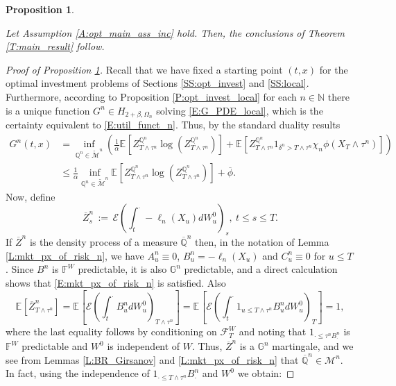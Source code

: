 \documentclass[11pt, letterpaper]{amsart}
\newtheorem{proposition}[theorem]{Proposition}
\theoremstyle{definition}
\theoremstyle{remark}
\numberwithin{equation}{section}
\newcommand{\nats}{\mathbb N}
\newcommand{\qprob}{\mathbb{Q}}
\newcommand{\esp}{\mathbb{E}}
\newcommand{\espalt}[2]{\esp^{#1}\bra{#2}}
\newcommand{\F}{\mathcal{F}}
\newcommand{\M}{\mathcal{M}}
\newcommand{\tM}{\widetilde{\mathcal{M}}}
\newcommand{\filt}{\mathbb{F}}
\newcommand{\filtg}{\mathbb{G}}
\newcommand{\EN}{\mathcal{E}}
\newcommand{\dfn}{\, := \,}
\newcommand{\bra}[1]{\left[#1\right]}
\newcommand{\ol}[1]{\overline{#1}}
\begin{document}
\begin{proposition}\label{P:unwind_prob_A}

Let Assumption \ref{A:opt_main_ass_inc} hold.  Then, the conclusions of Theorem \ref{T:main_result} follow.

\end{proposition}

\begin{proof}[Proof of Proposition \ref{P:unwind_prob_A}]

Recall that we have fixed a starting point $(t,x)$ for the optimal investment problems of Sections \ref{SS:opt_invest} and \ref{SS:local}. Furthermore, according to Proposition \ref{P:opt_invest_local} for each $n\in\nats$ there is a unique function $G^n\in H_{2+\beta,\Omega_n}$ solving \eqref{E:G_PDE_local}, which is the certainty equivalent to \eqref{E:util_funct_n}. Thus, by the standard duality results
\begin{equation}\label{E:standard_dual_local}
\begin{split}
G^n(t,x) &= \inf_{\qprob^n\in\tM^n}\left(\frac{1}{\alpha}\espalt{}{Z^{\qprob^n}_{T\wedge\tau^n}\log\left(Z^{\qprob^n}_{T\wedge\tau^n}\right)} + \espalt{}{Z^{\qprob^n}_{T\wedge\tau^n}1_{\delta^n>T\wedge\tau^n}\chi_n\phi(X_T\wedge\tau^n)}\right)\\
&\leq \frac{1}{\alpha} \inf_{\qprob^n\in\tM^n} \espalt{}{Z^{\qprob^n}_{T\wedge\tau^n}\log\left(Z^{\qprob^n}_{T\wedge\tau^n}\right)} + \ol{\phi}.
\end{split}
\end{equation}
Now, define
\begin{equation}\label{E:ol_Z_n_inc}
\ol{Z}^n_s \dfn \EN\left(\int_t^\cdot -\ell_n(X_u)dW^0_u\right)_s,\ t\leq s\leq T.
\end{equation}
If $\ol{Z}^n$ is the density process of a measure $\ol{\qprob}^n$ then, in the notation of Lemma \ref{L:mkt_px_of_risk_n}, we have $A^n_u \equiv 0$, $B^n_u = -\ell_n(X_u)$ and $C^n_u\equiv 0$ for $u\leq T$. Since $B^n$ is $\filt^{W}$ predictable, it is also $\filtg^n$ predictable, and a direct calculation shows that \eqref{E:mkt_px_of_risk_n} is satisfied. Also
\begin{equation*}
\espalt{}{\ol{Z}^n_{T\wedge\tau^n}} = \espalt{}{\EN\left(\int_t^\cdot B^n_u dW^0_u\right)_{T\wedge\tau^n}} = \espalt{}{\EN\left(\int_t^\cdot 1_{u\leq T\wedge\tau^n}B^n_u dW^0_u\right)_T} = 1,
\end{equation*}
where the last equality follows by conditioning on $\F^W_T$ and noting that $1_{\cdot\leq \tau^n B^n_\cdot}$ is $\filt^W$ predictable and $W^0$ is independent of $W$. Thus, $\ol{Z}^n$ is a $\filtg^n$ martingale, and we see from Lemmas \ref{L:BR_Girsanov} and \ref{L:mkt_px_of_risk_n} that $\ol{\qprob}^n\in\M^n$.  In fact, using the independence of $1_{\cdot\leq T\wedge\tau^n} B^n_\cdot$ and $W^0$ we obtain:

\end{proof}
\end{document}
